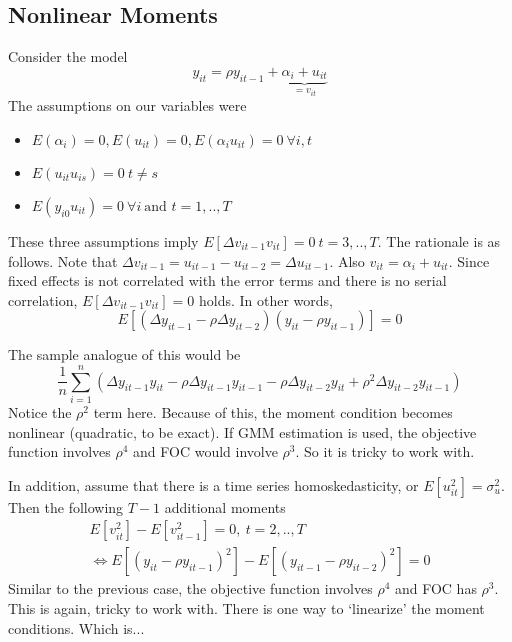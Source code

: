 \documentclass[12pt]{article}
\theoremstyle{definition}
\theoremstyle{property}
\theoremstyle{assumption}
\theoremstyle{example}
\theoremstyle{comment}
\begin{document}
\subsection{Nonlinear Moments}
Consider the model
\[
y_{it}=\rho y_{it-1}+\underbrace{\alpha_i +u_{it}}_{=v_{it}} 
\]
The assumptions on our variables were
\begin{itemize}
\item $E(\alpha_i)=0, E(u_{it})=0, E(\alpha_i u_{it})=0 \ \forall i,t$
\item $E(u_{it}u_{is})=0\  t\neq s$
\item $E(y_{i0}u_{it})=0 \ \forall i \ \text{and }t=1,..,T$
\end{itemize}
These three assumptions imply $E[\Delta v_{it-1}v_{it}]=0 \ t=3,..,T$. The rationale is as follows. Note that $\Delta v_{it-1}= u_{it-1}-u_{it-2}=\Delta u_{it-1}$. Also $v_{it}=\alpha_i + u_{it}$. Since fixed effects is not correlated with the error terms and there is no serial correlation, $E[\Delta v_{it-1}v_{it}]=0$ holds. In other words, 
\[
E[(\Delta y_{it-1}-\rho\Delta y_{it-2})(y_{it}-\rho y_{it-1})]=0
\]\par
The sample analogue of this would be
\[
\frac{1}{n}\sum_{i=1}^n (\Delta y_{it-1}y_{it}-\rho\Delta y_{it-1}y_{it-1}-\rho \Delta y_{it-2}y_{it}+\rho^2\Delta y_{it-2}y_{it-1})
\]
Notice the $\rho^2$ term here. Because of this, the moment condition becomes nonlinear (quadratic, to be exact). If GMM estimation is used, the objective function involves $\rho^4$ and FOC would involve $\rho^3$. So it is tricky to work with.
\par
In addition, assume that there is a time series homoskedasticity, or $E[u_{it}^2]=\sigma_u^2$. Then the following $T-1$ additional moments
\begin{gather*}
E[v_{it}^2]-E[v_{it-1}^2]=0, \ t=2,..,T\\
\iff E[(y_{it}-\rho y_{it-1})^2]-E[(y_{it-1}-\rho y_{it-2})^2]=0
\end{gather*}
Similar to the previous case, the objective function involves $\rho^4$ and FOC has $\rho^3$. This is again, tricky to work with. There is one way to `linearize' the moment conditions. Which is...
\end{document}
